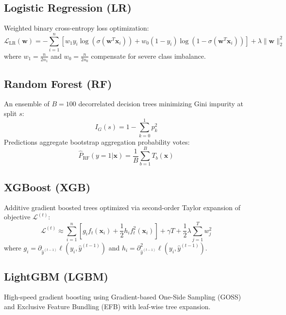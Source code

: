 \documentclass[12pt, a4paper]{report}
\begin{document}
\subsection{Logistic Regression (LR)}
Weighted binary cross-entropy loss optimization:
\begin{equation}
\mathcal{L}_{\text{LR}}(\mathbf{w}) = -\sum_{i=1}^n \left[ w_1 y_i \log(\sigma(\mathbf{w}^T \mathbf{x}_i)) + w_0 (1 - y_i) \log(1 - \sigma(\mathbf{w}^T \mathbf{x}_i)) \right] + \lambda \|\mathbf{w}\|_2^2
\end{equation}
where $w_1 = \frac{n}{2 n_1}$ and $w_0 = \frac{n}{2 n_0}$ compensate for severe class imbalance.

\subsection{Random Forest (RF)}
An ensemble of $B=100$ decorrelated decision trees \cite{breiman2001} minimizing Gini impurity at split $s$:
\begin{equation}
I_G(s) = 1 - \sum_{k=0}^1 p_k^2
\end{equation}
Predictions aggregate bootstrap aggregation probability votes:
\begin{equation}
\hat{P}_{\text{RF}}(y=1|\mathbf{x}) = \frac{1}{B} \sum_{b=1}^B T_b(\mathbf{x})
\end{equation}

\subsection{XGBoost (XGB)}
Additive gradient boosted trees \cite{chen2016} optimized via second-order Taylor expansion of objective $\mathcal{L}^{(t)}$:
\begin{equation}
\mathcal{L}^{(t)} \approx \sum_{i=1}^n \left[ g_i f_t(\mathbf{x}_i) + \frac{1}{2} h_i f_t^2(\mathbf{x}_i) \right] + \gamma T + \frac{1}{2} \lambda \sum_{j=1}^T w_j^2
\end{equation}
where $g_i = \partial_{\hat{y}^{(t-1)}} \ell(y_i, \hat{y}^{(t-1)})$ and $h_i = \partial_{\hat{y}^{(t-1)}}^2 \ell(y_i, \hat{y}^{(t-1)})$.

\subsection{LightGBM (LGBM)}
High-speed gradient boosting \cite{ke2017} using Gradient-based One-Side Sampling (GOSS) and Exclusive Feature Bundling (EFB) with leaf-wise tree expansion.
\end{document}
